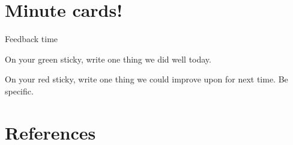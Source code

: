 \documentclass[aspectratio=1610, 11pt]{beamer} %
\begin{document}









\section{Minute cards!}
\begin{frame}{Feedback time}

On your green sticky, write one thing we did well today.

On your red sticky, write one thing we could improve upon for next time. Be specific. 

\end{frame}

\section{References}

\begin{multicols}{2}[]


\end{multicols}
\end{document}
